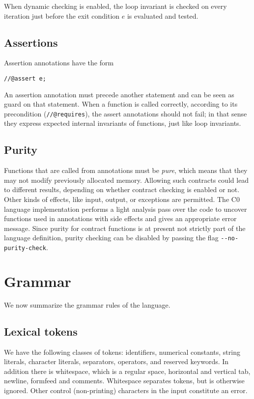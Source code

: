 \documentclass[11pt]{article}
\begin{document}
When dynamic checking is enabled, the loop invariant is checked on
every iteration just before the exit condition $e$ is evaluated and
tested.

\subsection{Assertions}

Assertion annotations have the form
\begin{lstlisting}
//@assert e;
\end{lstlisting}
An assertion annotation must precede another statement and can be seen
as guard on that statement.  When a function is called correctly,
according to its precondition (\lstinline'//@requires'), the assert
annotations should not fail; in that sense they express expected
internal invariants of functions, just like loop invariants.

\subsection{Purity}

Functions that are called from annotations must be \emph{pure}, which
means that they may not modify previously allocated memory.  Allowing
such contracts could lead to different results, depending on whether
contract checking is enabled or not.  Other kinds of effects, like
input, output, or exceptions are permitted.  The C0 language
implementation performs a light analysis pass over the code to uncover
functions used in annotations with side effects and gives an
appropriate error message.  Since purity for contract functions is at
present not strictly part of the language definition, purity checking
can be disabled by passing the flag \lstinline'--no-purity-check'.

\section{Grammar}

We now summarize the grammar rules of the language.

\subsection{Lexical tokens}

We have the following classes of tokens: identifiers, numerical
constants, string literals, character literals, separators, operators,
and reserved keywords.  In addition there is whitespace, which is
a regular space, horizontal and vertical tab, newline, formfeed
and comments.  Whitespace separates tokens, but is otherwise
ignored.  Other control (non-printing) characters in the input
constitute an error.
\end{document}

